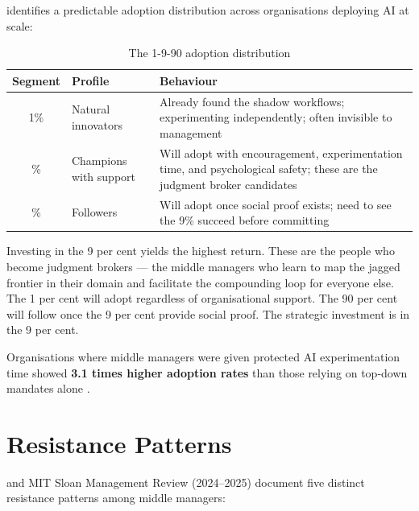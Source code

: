 \textcite{BCGAgenticShift2025} identifies a predictable adoption distribution across organisations deploying AI at scale:

\begin{table}[h]
\centering
\caption{The 1-9-90 adoption distribution}
\label{tab:adoption-distribution}
\begin{tabularx}{\textwidth}{c l X}
\toprule
\textbf{Segment} & \textbf{Profile} & \textbf{Behaviour} \\
\midrule
1\% & Natural innovators & Already found the shadow workflows; experimenting independently; often invisible to management \\
\addlinespace
9\% & Champions with support & Will adopt with encouragement, experimentation time, and psychological safety; these are the judgment broker candidates \\
\addlinespace
90\% & Followers & Will adopt once social proof exists; need to see the 9\% succeed before committing \\
\bottomrule
\end{tabularx}
\end{table}

Investing in the 9 per cent yields the highest return. These are the people who become judgment brokers --- the middle managers who learn to map the jagged frontier in their domain and facilitate the compounding loop for everyone else. The 1 per cent will adopt regardless of organisational support. The 90 per cent will follow once the 9 per cent provide social proof. The strategic investment is in the 9 per cent.

\begin{evidencebox}
Organisations where middle managers were given protected AI experimentation time showed \textbf{3.1 times higher adoption rates} than those relying on top-down mandates alone \parencite{BCGAIKPIs2025}.
\end{evidencebox}

\section{Resistance Patterns}

\textcite{Capgemini2025} and MIT Sloan Management Review (2024--2025) document five distinct resistance patterns among middle managers:

